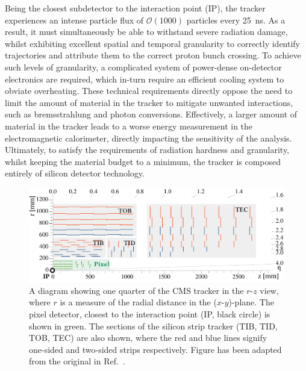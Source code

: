 Being the closest subdetector to the interaction point (IP), the tracker experiences an intense particle flux of $\mathcal{O}(1000)$ particles every 25~ns. As a result, it must simultaneously be able to withstand severe radiation damage, whilst exhibiting excellent spatial and temporal granularity to correctly identify trajectories and attribute them to the correct proton bunch crossing. To achieve such levels of granularity, a complicated system of power-dense on-detector electronics are required, which in-turn require an efficient cooling system to obviate overheating. These technical requirements directly oppose the need to limit the amount of material in the tracker to mitigate unwanted interactions, such as bremsstrahlung and photon conversions. Effectively, a larger amount of material in the tracker leads to a worse energy measurement in the electromagnetic calorimeter, directly impacting the sensitivity of the \Hgg analysis. Ultimately, to satisfy the requirements of radiation hardness and granularity, whilst keeping the material budget to a minimum, the tracker is composed entirely of silicon detector technology.

\begin{figure}[htb!]
  \centering
  \includegraphics[width=1\textwidth]{Figures/cms/tracker.pdf}
  \caption[The CMS silicon tracker]
  {
    A diagram showing one quarter of the CMS tracker in the $r$-$z$ view, where $r$ is a measure of the radial distance in the ($x$-$y$)-plane. The pixel detector, closest to the interaction point (IP, black circle) is shown in green. The sections of the silicon strip tracker (TIB, TID, TOB, TEC) are also shown, where the red and blue lines signify one-sided and two-sided strips respectively. Figure has been adapted from the original in Ref.~\cite{CERN-LHCC-2017-009}.
  }
  \label{fig:cms_tracker}
\end{figure}

